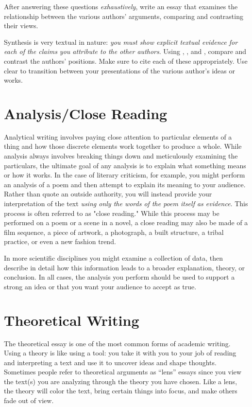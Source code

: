 \noindent After answering these questions \emph{exhaustively}, write an essay
that examines the relationship between the various authors’ arguments, comparing
and contrasting their views.

Synthesis is very textual in nature: \emph{you must show explicit textual
evidence for each of the claims you attribute to the other authors}. Using
\hyperlink{summary}{\color{Ahrenge}{summary}},
\hyperlink{paraphrase}{\color{Ahrenge}{paraphrase}}, and
\hyperlink{quotation}{\color{Ahrenge}{quotation}}, compare and contrast the
authors’ positions. Make sure to cite each of these appropriately. Use clear
\hyperlink{signalphrase}{\color{Ahrenge}{signal phrases}} to transition between
your presentations of the various author’s ideas or works.

\hypertarget{closereadingessay}{} \section{Analysis/Close Reading} Analytical
writing involves paying close attention to particular elements of a thing and
how those discrete elements work together to produce a whole. While analysis
always involves breaking things down and meticulously examining the particulars,
the ultimate goal of any analysis is to explain what something means or how it
works. In the case of literary criticism, for example, you might perform an analysis of a
poem and then attempt to explain its meaning to your audience.  Rather than
quote an outside authority, you will instead provide your interpretation
of the text \emph{using only the words of the poem itself as evidence}. This process is
often referred to as "close reading." While this process may be performed on a
poem or a scene in a novel, a close reading may also be made of a film
sequence, a piece of artwork, a photograph, a built structure, a tribal practice, or
even a new fashion trend.

In more scientific disciplines you might examine a collection of data, then
describe in detail how this information leads to a broader explanation, theory,
or conclusion. In all cases, the analysis you perform should be used to support
a strong \textemdash an idea or that you want your audience to accept as
true.

\hypertarget{theoreticalessay}{} \section{Theoretical Writing} The theoretical
essay is one of the most common forms of academic writing. Using a theory is
like using a tool: you take it with you to your job of reading and interpreting
a text and use it to uncover ideas and shape thoughts. Sometimes people refer to
theoretical arguments as “lens” essays since you view the text(s) you are
analyzing through the theory you have chosen. Like a lens, the theory will color
the text, bring certain things into focus, and make others fade out of view.

